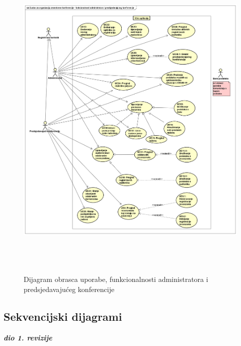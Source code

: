 						\begin{figure}[H]
						\includegraphics[height=16cm,width=15cm]{dijagrami/funkcionalnosti-administrator-predsjedavajucikonferencije.png} 
						\centering
						\caption{Dijagram obrasca uporabe, funkcionalnosti administratora i predsjedavajućeg konferencije}
						\label{fig:dijagramobrascauporabe3}
					\end{figure}
				\eject		
	
				
			\subsection{Sekvencijski dijagrami}
				
				\textbf{\textit{dio 1. revizije}}\\

